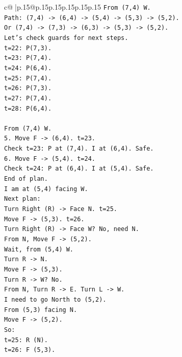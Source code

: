 \documentclass{article}
\begin{document}
{\begin{supertabular}{c@{$\;$}|p{.15\linewidth}@{}p{.15\linewidth}p{.15\linewidth}p{.15\linewidth}p{.15\linewidth}p{.15\linewidth}}
{{{\texttt{From (7,4) W.} \\
\texttt{Path: (7,4) {-}> (6,4) {-}> (5,4) {-}> (5,3) {-}> (5,2).} \\
\texttt{Or (7,4) {-}> (7,3) {-}> (6,3) {-}> (5,3) {-}> (5,2).} \\
\texttt{Let's check guards for next steps.} \\
\texttt{t=22: P(7,3).} \\
\texttt{t=23: P(7,4).} \\
\texttt{t=24: P(6,4).} \\
\texttt{t=25: P(7,4).} \\
\texttt{t=26: P(7,3).} \\
\texttt{t=27: P(7,4).} \\
\texttt{t=28: P(6,4).} \\
\\ 
\texttt{From (7,4) W.} \\
\texttt{5. Move F {-}> (6,4). t=23.} \\
\texttt{Check t=23: P at (7,4). I at (6,4). Safe.} \\
\texttt{6. Move F {-}> (5,4). t=24.} \\
\texttt{Check t=24: P at (6,4). I at (5,4). Safe.} \\
\texttt{End of plan.} \\
\texttt{I am at (5,4) facing W.} \\
\texttt{Next plan:} \\
\texttt{Turn Right (R) {-}> Face N. t=25.} \\
\texttt{Move F {-}> (5,3). t=26.} \\
\texttt{Turn Right (R) {-}> Face W? No, need N.} \\
\texttt{From N, Move F {-}> (5,2).} \\
\texttt{Wait, from (5,4) W.} \\
\texttt{Turn R {-}> N.} \\
\texttt{Move F {-}> (5,3).} \\
\texttt{Turn R {-}> W? No.} \\
\texttt{From N, Turn R {-}> E. Turn L {-}> W.} \\
\texttt{I need to go North to (5,2).} \\
\texttt{From (5,3) facing N.} \\
\texttt{Move F {-}> (5,2).} \\
\texttt{So:} \\
\texttt{t=25: R (N).} \\
\texttt{t=26: F (5,3).} \\
}}}
\end{supertabular}}
\end{document}
